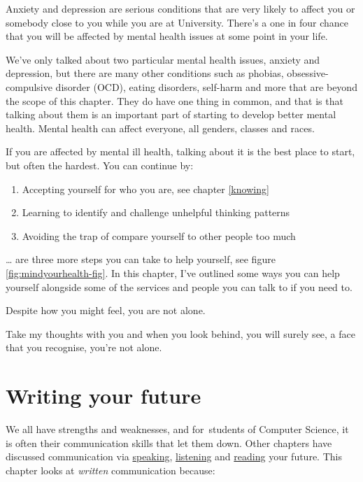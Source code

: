 \documentclass[
]{book}
\providecommand{\tightlist}{%
  \setlength{\itemsep}{0pt}\setlength{\parskip}{0pt}}
\begin{document}
Anxiety and depression are serious conditions that are very likely to affect you or somebody close to you while you are at University. There's a one in four chance that you will be affected by mental health issues at some point in your life.

We've only talked about two particular mental health issues, anxiety and depression, but there are many other conditions such as phobias, obsessive-compulsive disorder (OCD), eating disorders, self-harm and more that are beyond the scope of this chapter. They do have one thing in common, and that is that talking about them is an important part of starting to develop better mental health. Mental health can affect everyone, all genders, classes and races.

If you are affected by mental ill health, talking about it is the best place to start, but often the hardest. You can continue by:

\begin{enumerate}
\def\labelenumi{\arabic{enumi}.}
\tightlist
\item
  Accepting yourself for who you are, see chapter \ref{knowing}
\item
  Learning to identify and challenge unhelpful thinking patterns
\item
  Avoiding the trap of compare yourself to other people too much
\end{enumerate}

\ldots{} are three more steps you can take to help yourself, see figure \ref{fig:mindyourhealth-fig}. In this chapter, I've outlined some ways you can help yourself alongside some of the services and people you can talk to if you need to.

Despite how you might feel, you are not alone.

Take my thoughts with you and when you look behind, you will surely see, a face that you recognise, you're not alone. \citep{yourenotalone}

\hypertarget{writing}{%
\chapter{Writing your future}\label{writing}}

We all have strengths and weaknesses, and for~students of Computer Science, it is often their communication skills that let them down. Other chapters have discussed communication via \href{https://www.cdyf.me/speaking}{speaking}, \href{https://www.cdyf.me/hearing}{listening} and \href{https://www.cdyf.me/reading}{reading} your future. This chapter looks at \emph{written} communication because:
\end{document}
